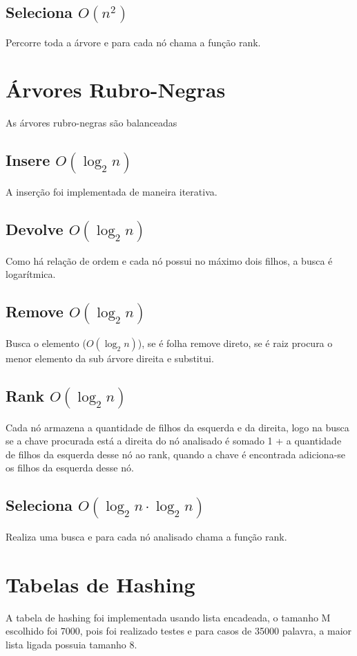 \documentclass[14pt]{article}
\begin{document}
{\subsection{Seleciona $O(n^2)$}
Percorre toda a árvore e para cada nó chama a função rank.
\\

\section{Árvores Rubro-Negras}
As árvores rubro-negras são balanceadas

\subsection{Insere $O(\log_{2}n)$} 
A inserção foi implementada de maneira iterativa.
\subsection{Devolve $O(\log_{2}n)$} 
Como há relação de ordem e cada nó possui no máximo dois filhos, a busca é logarítmica.
\subsection{Remove $O(\log_{2}n)$}
Busca o elemento ($O(\log_{2}n)$), se é folha remove direto, se é raiz procura o menor elemento da 
sub árvore direita e substitui.
\subsection{Rank $O(\log_{2}n)$}
Cada nó armazena a quantidade de filhos da esquerda e da direita, logo na busca se a chave procurada
está a direita do nó analisado é somado 1 + a quantidade de filhos da esquerda desse nó ao rank, quando a chave 
é encontrada adiciona-se os filhos da esquerda desse nó.
\subsection{Seleciona $O(\log_{2}n \cdot \log_{2}n )$}
Realiza uma busca e para cada nó analisado chama a função rank.
\\

\section{Tabelas de Hashing}
A tabela de hashing foi implementada usando lista encadeada, o tamanho M escolhido foi 7000, pois foi
realizado testes e para casos de 35000 palavra, a maior lista ligada possuia tamanho 8. 
}
\end{document}
